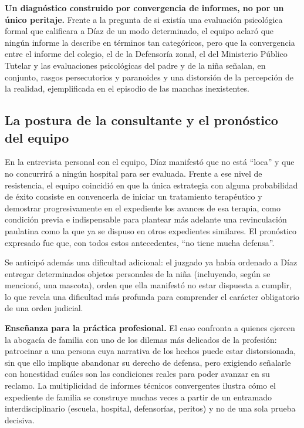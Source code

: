 \documentclass[12pt,oneside]{book}
\begin{document}
\begin{important}
\textbf{Un diagnóstico construido por convergencia de informes, no por un único peritaje.} Frente a la pregunta de si existía una evaluación psicológica formal que calificara a Díaz de un modo determinado, el equipo aclaró que ningún informe la describe en términos tan categóricos, pero que la convergencia entre el informe del colegio, el de la Defensoría zonal, el del Ministerio Público Tutelar y las evaluaciones psicológicas del padre y de la niña señalan, en conjunto, rasgos persecutorios y paranoides y una distorsión de la percepción de la realidad, ejemplificada en el episodio de las manchas inexistentes.
\end{important}

\subsection{La postura de la consultante y el pronóstico del equipo}

En la entrevista personal con el equipo, Díaz manifestó que no está ``loca'' y que no concurrirá a ningún hospital para ser evaluada. Frente a ese nivel de resistencia, el equipo coincidió en que la única estrategia con alguna probabilidad de éxito consiste en convencerla de iniciar un tratamiento terapéutico y demostrar progresivamente en el expediente los avances de esa terapia, como condición previa e indispensable para plantear más adelante una revinculación paulatina como la que ya se dispuso en otros expedientes similares. El pronóstico expresado fue que, con todos estos antecedentes, ``no tiene mucha defensa''.

Se anticipó además una dificultad adicional: el juzgado ya había ordenado a Díaz entregar determinados objetos personales de la niña (incluyendo, según se mencionó, una mascota), orden que ella manifestó no estar dispuesta a cumplir, lo que revela una dificultad más profunda para comprender el carácter obligatorio de una orden judicial.

\begin{note}
\textbf{Enseñanza para la práctica profesional.} El caso confronta a quienes ejercen la abogacía de familia con uno de los dilemas más delicados de la profesión: patrocinar a una persona cuya narrativa de los hechos puede estar distorsionada, sin que ello implique abandonar su derecho de defensa, pero exigiendo señalarle con honestidad cuáles son las condiciones reales para poder avanzar en su reclamo. La multiplicidad de informes técnicos convergentes ilustra cómo el expediente de familia se construye muchas veces a partir de un entramado interdisciplinario (escuela, hospital, defensorías, peritos) y no de una sola prueba decisiva.
\end{note}
\end{document}
